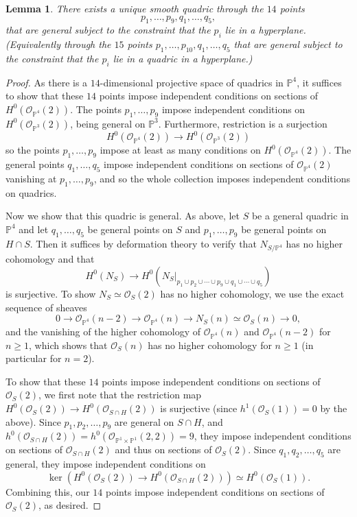 \documentclass[11pt]{amsart}
\newcommand{\pp}{\mathbb{P}}
\renewcommand{\O}{\mathcal{O}}
\newtheorem{lem}[thm]{Lemma}
\theoremstyle{definition}
\theoremstyle{remark}
\begin{document}
\begin{lem}\label{sm_quad}
There exists a unique smooth quadric through the $14$ points 
\[p_1, \ldots, p_9, q_1, \ldots, q_5,\]
that are general subject to the constraint that the $p_i$ lie in a hyperplane.  
(Equivalently through the $15$ points
$p_1, \ldots, p_{10}, q_1, \ldots, q_5$ that are general subject to the 
constraint that the $p_i$ lie in a quadric in a hyperplane.)
\end{lem}
\begin{proof}
As there is a $14$-dimensional projective space of quadrics in $\pp^4$, it suffices to show that these $14$ points impose independent conditions on sections of $H^0(\O_{\pp^4}(2))$.  The points $p_1, \ldots, p_9$ impose independent conditions on $H^0(\O_{\pp^3}(2))$, being general on $\pp^3$.  Furthermore, restriction is a surjection
\[H^0(\O_{\pp^4}(2)) \to H^0(\O_{\pp^3}(2)) \]
so the points $p_1, \ldots, p_9$ impose at least as many conditions on $H^0(\O_{\pp^4}(2))$.  The general points $q_1, \ldots, q_5$ impose independent conditions on sections of $\O_{\pp^4}(2)$ vanishing at $p_1, \ldots, p_9$, and so the whole collection imposes independent conditions on quadrics.

Now we show that this quadric is general.  As above, let $S$ be a general quadric in $\pp^4$ and let $q_1, \ldots, q_5$ be general points on $S$ and $p_1, \ldots, p_9$ be general points on $H \cap S$.  Then it suffices by deformation theory to verify that $N_{S/ \pp^4}$ has no higher cohomology and that
\[H^0(N_S) \to H^0(N_S|_{p_1 \cup p_2 \cup \cdots \cup p_9 \cup q_1 \cup \cdots \cup q_5})\]
is surjective.
To show $N_S \simeq \O_S(2)$ has no higher cohomology,
we use the exact sequence of sheaves
\[0 \to \O_{\pp^4}(n - 2) \to \O_{\pp^4}(n) \to N_S(n) \simeq \O_S(n) \to 0,\]
and the vanishing of the higher cohomology of $\O_{\pp^4}(n)$ and $\O_{\pp^4}(n - 2)$ for $n \geq 1$, which shows that $\O_S(n)$ has no higher cohomology for
$n \geq 1$ (in particular for $n = 2$).

To show that these $14$ points
impose independent conditions on sections of $\O_S(2)$,
we first note that the restriction map $H^0(\O_S(2)) \to H^0(\O_{S \cap H}(2))$
is surjective (since $h^1(\O_S(1)) = 0$ by the above).
Since $p_1, p_2, \ldots, p_9$ are general on $S \cap H$,
and $h^0(\O_{S \cap H}(2)) = h^0(\O_{\pp^1 \times \pp^1}(2, 2)) = 9$,
they impose independent conditions on sections of $\O_{S \cap H}(2)$
and thus on sections of $\O_S(2)$.
Since $q_1, q_2, \ldots, q_5$ are general, they impose independent
conditions on
\[\ker(H^0(\O_S(2)) \to H^0(\O_{S \cap H}(2))) \simeq H^0(\O_S(1)).\]
Combining this, our $14$ points impose independent conditions on sections of $\O_S(2)$, as desired.
\end{proof}
\end{document}

